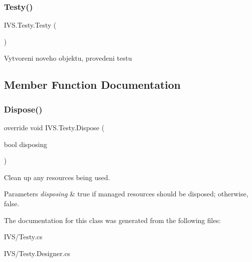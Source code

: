\subsubsection{\texorpdfstring{Testy()}{Testy()}}
{\footnotesize\ttfamily I\+V\+S.\+Testy.\+Testy (\begin{DoxyParamCaption}{ }\end{DoxyParamCaption})}



Vytvoreni noveho objektu, provedeni testu 



\subsection{Member Function Documentation}
\mbox{\label{class_i_v_s_1_1_testy_a231cc8b0d786365ab6a36d8e7ef902aa}} 
\subsubsection{\texorpdfstring{Dispose()}{Dispose()}}
{\footnotesize\ttfamily override void I\+V\+S.\+Testy.\+Dispose (\begin{DoxyParamCaption}\item[{bool}]{disposing }\end{DoxyParamCaption})\hspace{0.3cm}{\ttfamily [protected]}}



Clean up any resources being used. 


\begin{DoxyParams}{Parameters}
{\em disposing} & true if managed resources should be disposed; otherwise, false.\\
\hline
\end{DoxyParams}


The documentation for this class was generated from the following files\+:\begin{DoxyCompactItemize}
\item 
I\+V\+S/Testy.\+cs\item 
I\+V\+S/Testy.\+Designer.\+cs\end{DoxyCompactItemize}
